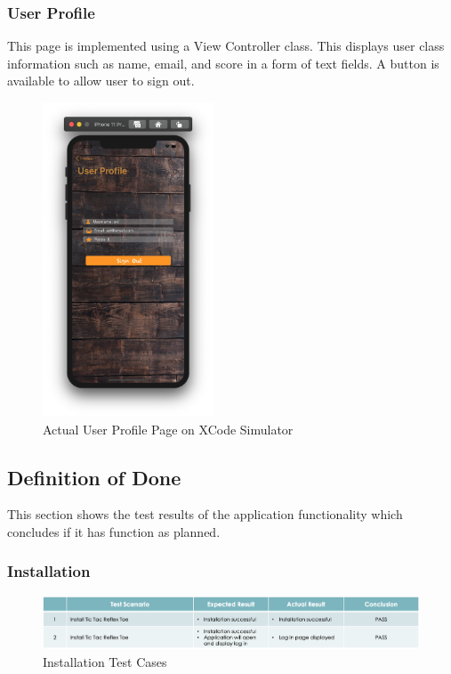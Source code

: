 \documentclass{article}
\begin{document}
    \subsubsection{User Profile}
    This page is implemented using a View Controller class.  This displays user class information such as name, email, and score in a form of text fields.  A button is available to allow user to sign out.
        \begin{figure}[h]
            \centering
            \includegraphics[width=2in]{images/sim_user.png}
        \caption{Actual User Profile Page on XCode Simulator}
        \end{figure}  

\newpage
\subsection{Definition of Done} This section shows the test results of the application functionality which concludes if it has function as planned.
    \subsubsection{Installation}
         \begin{figure}[h]
            \centering
            \includegraphics[width=5.5in]{images/test_1_install.png}
        \caption{Installation Test Cases}
        \end{figure}   
\end{document}
